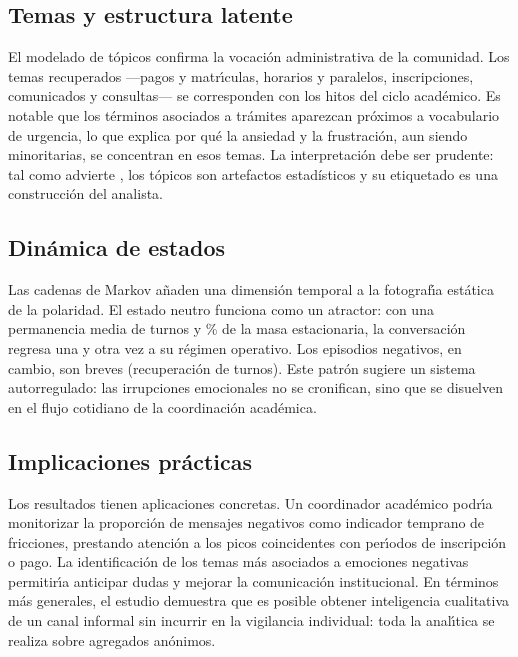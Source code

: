 \subsection{Temas y estructura latente}

El modelado de tópicos confirma la vocaci\'on administrativa de la comunidad. Los temas
recuperados ---pagos y matr\'\i{}culas, horarios y paralelos, inscripciones, comunicados y
consultas--- se corresponden con los hitos del ciclo acad\'emico. Es notable que los
términos asociados a trámites aparezcan pr\'oximos a vocabulario de urgencia, lo que
explica por qué la ansiedad y la frustraci\'on, aun siendo minoritarias, se concentran en
esos temas. La interpretaci\'on debe ser prudente: tal como advierte
\citet{grimmer2013text}, los tópicos son artefactos estad\'isticos y su etiquetado es una
construcci\'on del analista.

\subsection{Dinámica de estados}

Las cadenas de Markov a\~naden una dimensi\'on temporal a la fotograf\'\i{}a est\'atica de
la polaridad. El estado neutro funciona como un atractor: con una permanencia media de
\permanenciaNeutro{} turnos y \pctNeutro{}\% de la masa estacionaria, la conversaci\'on
regresa una y otra vez a su régimen operativo. Los episodios negativos, en cambio, son
breves (recuperaci\'on de \recuperacionNegativa{} turnos). Este patr\'on sugiere un
sistema autorregulado: las irrupciones emocionales no se cronifican, sino que se disuelven
en el flujo cotidiano de la coordinaci\'on acad\'emica.

\subsection{Implicaciones pr\'acticas}

Los resultados tienen aplicaciones concretas. Un coordinador acad\'emico podr\'\i{}a
monitorizar la proporci\'on de mensajes negativos como indicador temprano de fricciones,
prestando atenci\'on a los picos coincidentes con per\'\i{}odos de inscripci\'on o pago.
La identificaci\'on de los temas m\'as asociados a emociones negativas permitir\'\i{}a
anticipar dudas y mejorar la comunicaci\'on institucional. En t\'erminos m\'as generales,
el estudio demuestra que es posible obtener inteligencia cualitativa de un canal
informal sin incurrir en la vigilancia individual: toda la anal\'\i{}tica se realiza sobre
agregados an\'onimos.

